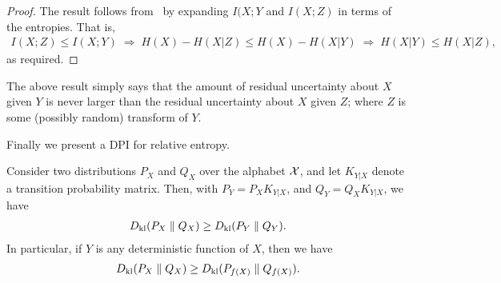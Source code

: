                 \begin{proof}
                    The result follows from~ by expanding $I(X;Y$ and $I(X;Z)$ in terms of the entropies. That is, 
                    \begin{align}
                    I(X; Z) \leq I(X; Y) \; \Rightarrow \; H(X) - H(X|Z) \leq H(X) - H(X|Y)\; \Rightarrow \; H(X|Y) \leq H(X|Z), 
                    \end{align}
                    as required. 
                \end{proof}
                The above result simply says that the amount of residual uncertainty about $X$ given $Y$ is never larger than the residual uncertainty about $X$ given $Z$; where $Z$ is some (possibly random) transform of $Y$. 

                Finally we present a DPI for relative entropy.                 
                \begin{theorem}
                    \label{thm:dpi-relative-entropy} Consider two distributions $P_X$ and $Q_X$ over the alphabet $\mathcal{X}$, and let $K_{Y|X}$ denote a transition probability matrix. Then, with $P_Y = P_XK_{Y|X}$, and $Q_Y = Q_X K_{Y|X}$, we have 
                    \begin{align}
                        D_{\text{kl}}(P_X \parallel Q_X) \geq D_{\text{kl}}(P_Y \parallel Q_Y). 
                    \end{align}
                    In particular, if $Y$ is any deterministic function of $X$, then we have 
                    \begin{align}
                        D_{\text{kl}}(P_X \parallel Q_X) \geq D_{\text{kl}}(P_{f(X)} \parallel Q_{f(X)} ). 
                    \end{align}
                \end{theorem}

